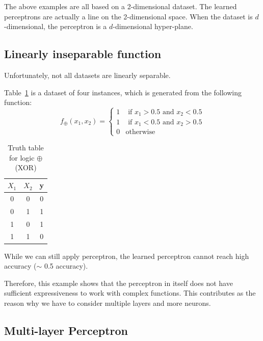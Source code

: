 The above examples are all based on a 2-dimensional dataset. The learned perceptrons are actually a line on the 2-dimensional space. When the dataset is $d$-dimensional, the perceptron is a $d$-dimensional hyper-plane. 

\subsection*{Linearly inseparable function}

Unfortunately, not all datasets are linearly separable. 

\begin{example}\label{example:xor}
Table~\ref{tab:truthtablexor} is a dataset of four instances, which is generated from the following function:  
\begin{equation}
    f_\oplus(x_1,x_2) = 
    \begin{cases}
    1 & \text{ if } x_1 > 0.5 \text{ and } x_2 < 0.5 \\
    1 & \text{ if } x_1 < 0.5 \text{ and } x_2 > 0.5 \\
    0 & \text{otherwise}
    \end{cases}
\end{equation}
\begin{table}[!htbp]
    \centering
    \begin{tabular}{|c|c||c|}
    \hline
     $X_1$  &  $X_2$   &  \textbf{y} \\
     \hline
      0     & 0  & 0 \\
      0 & 1 & 1 \\
      1 & 0 & 1 \\
      1 & 1 & 0 \\
      \hline
    \end{tabular}
    \caption{Truth table for logic $\oplus$ (XOR)}
    \label{tab:truthtablexor}
\end{table}
While we can still apply perceptron, the learned perceptron cannot reach high accuracy ($\sim$ 0.5 accuracy). 
\end{example}

Therefore, this example shows that the perceptron in itself does not have sufficient expressiveness to work with complex functions. This contributes as the reason why we have to consider multiple layers and more neurons.  

\subsection{Multi-layer Perceptron} 

